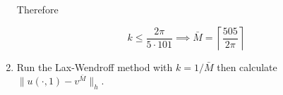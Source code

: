 \documentclass[11pt]{amsart}
\numberwithin{equation}{section}
\begin{document}
\begin{enumerate}
{          Therefore
          
          \begin{equation}
              k \le \frac{2\pi}{5 \cdot 101} \implies \bar M = \left\lceil \frac{505}{2\pi} \right\rceil
          \end{equation}
          
          }
          
    \item Run the Lax-Wendroff method with $k=1/\bar{M}$ then calculate $\|u(\cdot, 1)-v^{\bar{M}}\|_h$.
          
              {\color{blue}
                  
                  
                  
              }
          
\end{enumerate}
\end{document}
